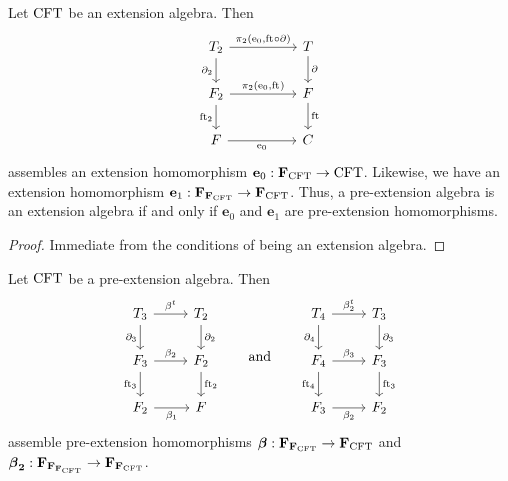\begin{lem}
Let $\mathrm{CFT}$ be an extension algebra. Then
\begin{equation*}
\begin{tikzcd}[column sep=huge]
\stesyst_2
  \ar{r}{\pullbackpr{2}{\ectxext}{\eft\circ\ebd}}
  \ar{d}[swap]{\ebd[2]}
  &
\stesyst
  \ar{d}{\ebd}
  \\
\stesysf_2
  \ar{r}{\pullbackpr{2}{\ectxext}{\eft}}
  \ar{d}[swap]{\eft[2]}
  &
\stesysf
  \ar{d}{\eft}
  \\
\stesysf
  \ar{r}[swap]{\ectxext}
  &
\stesysc
\end{tikzcd}
\end{equation*}
assembles an extension homomorphism $\mathbf{e}_0:\mathbf{F}_{\mathrm{CFT}}\to\mathrm{CFT}$.
Likewise, we have an extension homomorphism
$\mathbf{e}_1:\mathbf{F}_{\mathbf{F}_{\mathrm{CFT}}}\to\mathbf{F}_{\mathrm{CFT}}$. Thus, a
pre-extension algebra is an extension algebra if and only if $\mathbf{e}_0$
and $\mathbf{e}_1$ are pre-extension homomorphisms.
\end{lem}

\begin{proof}
Immediate from the conditions of being an extension algebra.
\end{proof}

\begin{defn}
Let $\mathrm{CFT}$ be a pre-extension algebra. Then
\begin{equation*}
\begin{tikzcd}
\stesyst_3
  \ar{r}{\beta^t}
  \ar{d}[swap]{\ebd[3]}
  &
\stesyst_2
  \ar{d}{\ebd[2]}
  \\
\stesysf_3
  \ar{r}{\beta_2}
  \ar{d}[swap]{\eft[3]}
  &
\stesysf_2
  \ar{d}{\eft[2]}
  \\
\stesysf_2
  \ar{r}[swap]{\beta_1}
  &
\stesysf
\end{tikzcd}
\qquad
\text{and}
\qquad
\begin{tikzcd}
\stesyst_4
  \ar{r}{\beta^t_2}
  \ar{d}[swap]{\ebd[4]}
  &
\stesyst_3
  \ar{d}{\ebd[3]}
  \\
\stesysf_4
  \ar{r}{\beta_3}
  \ar{d}[swap]{\eft[4]}
  &
\stesysf_3
  \ar{d}{\eft[3]}
  \\
\stesysf_3
  \ar{r}[swap]{\beta_2}
  &
\stesysf_2
\end{tikzcd}
\end{equation*}
assemble pre-extension homomorphisms 
\(
\boldsymbol{\beta}
  :
\mathbf{F}_{\mathbf{F}_{\mathrm{CFT}}}
  \to
\mathbf{F}_{\mathrm{CFT}}
\) 
and
\(
\boldsymbol{\beta}_\mathbf{2}
  :
\mathbf{F}_{\mathbf{F}_{\mathbf{F}_{\mathrm{CFT}}}}
  \to
\mathbf{F}_{\mathbf{F}_{\mathrm{CFT}}}
\).
\end{defn}

